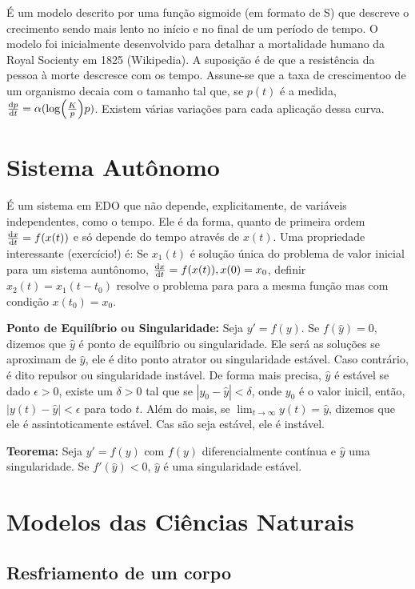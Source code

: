 \documentclass[12pt]{article}
\begin{document}
É um modelo descrito por uma função sigmoide (em formato de S) que descreve o
crecimento sendo mais lento no início e no final de um período de tempo. O
modelo foi inicialmente desenvolvido para detalhar a mortalidade humano da
Royal Socienty em 1825 (Wikipedia). A suposição é de que a resistência da pessoa à morte
descresce com os tempo. Assune-se que a taxa de crescimentoo de um organismo
decaia com o tamanho tal que, se $p(t)$ é a medida, $\dv{p}{t} =
\alpha(\log(\frac{K}{p})p)$. Existem várias variações para cada aplicação
dessa curva. 

\section{Sistema Autônomo}

É um sistema em EDO que não depende, explicitamente, de variáveis
independentes, como o tempo. Ele é da forma, quanto de primeira ordem
$\dv{x}{t} = f(x(t))$ e só depende do tempo através de $x(t)$. Uma propriedade
interessante (exercício!) é: Se $x_1(t)$ é solução única do problema de valor
inicial para um sistema auntônomo, $\dv{x}{t} = f(x(t)), x(0) = x_0$,
definir $x_2(t) = x_1(t - t_0)$ resolve o problema para para a mesma função
mas com condição $x(t_0) = x_0$. 

\textbf{Ponto de Equilíbrio ou Singularidade:} Seja $y' = f(y)$. Se
$f(\hat{y}) = 0$, dizemos que $\hat{y}$ é ponto de equilíbrio ou
singularidade. Ele será as soluções se aproximam de $\hat{y}$, ele é dito
ponto atrator ou singularidade estável. Caso contrário, é dito repulsor ou
singularidade instável. De forma mais precisa, $\hat{y}$ é estável se dado
$\epsilon > 0$, existe um $\delta > 0$ tal que se $|y_0 - \hat{y}| < \delta$,
onde $y_0$ é o valor inicil, então, $|y(t) - \hat{y}| < \epsilon$ para todo
$t$. Além do mais, se $\lim_{t \to \infty} y(t) = \hat{y}$, dizemos que ele é
assintoticamente estável. Cas são seja estável, ele é instável.  

\textbf{Teorema:} Seja $y' = f(y)$ com $f(y)$ diferencialmente contínua e
$\hat{y}$ uma singularidade. Se $f'(\hat{y}) < 0$, $\hat{y}$ é uma
singularidade estável. 

\section{Modelos das Ciências Naturais}

\subsection{Resfriamento de um corpo}
\end{document}
